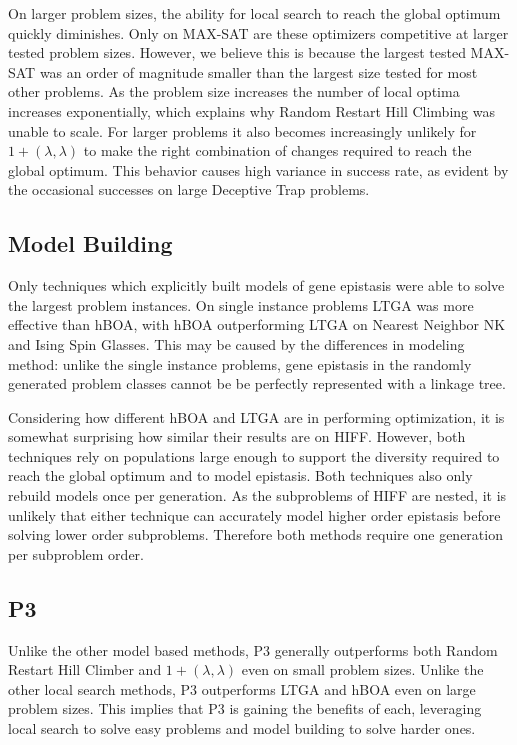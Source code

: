 \documentclass[twoside]{article}
\begin{document}
On larger problem sizes, the ability for local search to reach the global optimum quickly diminishes.
Only on MAX-SAT are these optimizers competitive
at larger tested problem sizes. However, we believe this is because the largest tested MAX-SAT
was an order of magnitude smaller than the largest size tested for most other problems. As the problem
size increases the number of local optima increases exponentially, which explains why Random Restart Hill
Climbing was unable to scale.
For larger problems it also becomes increasingly unlikely for $1+(\lambda, \lambda)$ to make the right combination
of changes required to reach the global optimum. This
behavior causes high variance in success rate, as evident by the occasional successes on large Deceptive Trap problems.

\subsection{Model Building}
Only techniques which explicitly built models of gene epistasis were able to solve the largest problem
instances. On single instance problems LTGA was more effective than hBOA, with hBOA outperforming
LTGA on Nearest Neighbor NK and Ising Spin Glasses. This may be caused by the differences in modeling method:
unlike the single instance problems, gene epistasis in the randomly generated
problem classes cannot be be perfectly represented with a linkage tree.

Considering how different hBOA and LTGA are in performing optimization, it is somewhat surprising how similar
their results are on HIFF.
However, both techniques rely on populations large enough to support the diversity required to reach the global optimum
and to model epistasis. Both techniques also only rebuild models once per generation. As the subproblems of HIFF
are nested, it is unlikely that either technique can accurately model higher order epistasis before solving
lower order subproblems. Therefore both methods require one generation per subproblem order.

\subsection{P3}
Unlike the other model based methods, P3 generally outperforms
both Random Restart Hill Climber and $1+(\lambda, \lambda)$ even on small problem sizes.
Unlike the other local search methods, P3 outperforms LTGA and hBOA even on large problem sizes.
This implies that P3 is gaining the benefits of each, leveraging local search to solve easy
problems and model building to solve harder ones.
\end{document}
